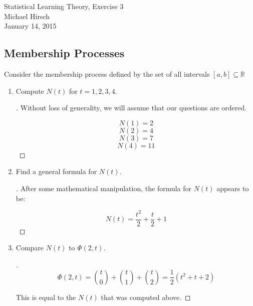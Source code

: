 \documentclass[]{book}
\theoremstyle{definition}
\begin{document}
\begin{center}
{\Large Statistical Learning Theory, Exercise 3}\\
Michael Hirsch\\ %
January 14, 2015 %
\end{center}

\vspace{0.2 cm}


\subsection*{Membership Processes}

Consider the membership process defined by the set of all intervals $[a, b] \subseteq \mathbb{R}$


\begin{enumerate}
\item\label{norms}

Compute $N(t)$ for $t = 1, 2, 3, 4$.

\begin{proof}[\unskip\nopunct]

Without loss of generality, we will assume that our questions are ordered. 

$$N(1) = 2$$
$$N(2) = 4$$
$$N(3) = 7$$
$$N(4) = 11$$



\end{proof}

\item

Find a general formula for $N(t)$.

\begin{proof}[\unskip\nopunct]

After some mathematical manipulation, the formula for $N(t)$ appears to be:

$$N(t) = \dfrac{t^{2}}{2} + \dfrac{t}{2} + 1 $$

\end{proof}

\item	

Compare $N(t)$ to $\Phi(2,t)$.

\begin{proof}[\unskip\nopunct]
		
$$\Phi(2,t) = {t \choose 0} + {t \choose 1} + {t \choose 2} = \dfrac{1}{2}(t^{2}+t+2) $$

This is equal to the $N(t)$ that was computed above.

\end{proof}

\end{enumerate}
\end{document}
